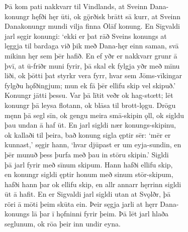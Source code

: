 \documentclass[12pt,letterpaper]{book}
\begin{document}
\begin{linenumbers}
Þā kom pati nakkvarr til Vindlands, at Sveinn Dana-\\
konungr hęfði hęr ūti, ok gǫ̈rðisk brātt sā kurr, at Sveinn\\
Danakonungr mundi vilja finna Ōlāf konung.  En Sigvaldi\\
jarl sęgir konungi: `ekki er þat rāð Sveins konungs at\\
lęggja til bardaga við þik með Dana-hęr einn saman, svā\\
mikinn hęr sem þēr hafið.  En ef yðr er nakkvarr grunr ā\\
þvī, at ū-friðr muni fyrir, þā skal ek fylgja yðr með mīnu\\
liði, ok þōtti þat styrkr vera fyrr, hvar sem Jōms-vīkingar\\
fylgðu hǫfðingjum; mun ek fā þēr ellifu skip vel skipuð.'\\
Konungr jātti þessu.  Var þā lītit veðr ok hag-stœtt; lēt\\
konungr þā leysa flotann, ok blāsa til brott-lǫgu.  Drōgu\\
męnn þā segl sīn, ok gengu meira smā-skipin ǫll, ok sigldu\\
þau undan ā haf ūt.  En jarl sigldi nær konungs-skipinu,\\
ok kallaði til þeira, bað konung sigla ęptir sēr: `mēr er\\
kunnast,' sęgir hann, `hvar djūpast er um eyja-sundin, en\\
þēr munuð þess þurfa með þau in stōru skipin.'  Sigldi\\
þā jarl fyrir með sīnum skipum.  Hann hafði ellifu skip,\\
en konungr sigldi ęptir honum með sinum stōr-skipum,\\
hafði hann þar ok ellifu skip, en allr annarr hęrrinn sigldi\\
ūt ā hafit.  En er Sigvaldi jarl sigldi utan at Svǫlðr, þā\\
röri ā mōti þeim skūta ein.  Þeir sęgja jarli at hęrr Dana-\\
konungs lā þar ī hǫfninni fyrir þeim.  Þā lēt jarl hlaða\\
seglunum, ok rōa þeir inn undir eyna.


\end{linenumbers}
\end{document}
